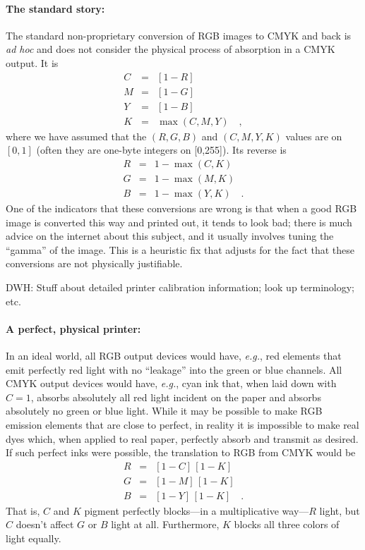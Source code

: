 \documentclass[letterpaper,preprint,dvipdf]{aastex}
\newcommand{\latin}[1]{\textit{#1}}
\newcommand{\eg}{\latin{e.g.}}
\begin{document}
\paragraph{The standard story:}
The standard non-proprietary conversion of RGB images to CMYK and back
is \latin{ad hoc} and does not consider the physical process of
absorption in a CMYK output.  It is
\begin{eqnarray}\displaystyle
C & = & [1-R] \nonumber \\
M & = & [1-G] \nonumber \\
Y & = & [1-B] \nonumber \\
K & = & \max(C,M,Y) \quad ,
\end{eqnarray}
where we have assumed that the $(R,G,B)$ and $(C,M,Y,K)$ values are on
$[0,1]$ (often they are one-byte integers on [0,255]).  Its reverse is
\begin{eqnarray}\displaystyle
R & = & 1-\max(C,K) \nonumber \\
G & = & 1-\max(M,K) \nonumber \\
B & = & 1-\max(Y,K) \quad .
\label{eq:standard}
\end{eqnarray}
One of the indicators that these conversions are wrong is that when a
good RGB image is converted this way and printed out, it tends to look
bad; there is much advice on the internet about this subject, and it
usually involves tuning the ``gamma'' of the image.  This is a
heuristic fix that adjusts for the fact that these conversions are not
physically justifiable.

DWH: Stuff about detailed printer calibration information; look up
terminology; etc.

\paragraph{A perfect, physical printer:}
In an ideal world, all RGB output devices would have, \eg, red
elements that emit perfectly red light with no ``leakage'' into the
green or blue channels.  All CMYK output devices would have, \eg, cyan
ink that, when laid down with $C=1$, absorbs absolutely all red light
incident on the paper and absorbs absolutely no green or blue light.
While it may be possible to make RGB emission elements that are close
to perfect, in reality it is impossible to make real dyes which, when
applied to real paper, perfectly absorb and transmit as desired.
If such perfect inks were possible, the translation to RGB from CMYK
would be
\begin{eqnarray}\displaystyle
R & = & [1-C]\,[1-K] \nonumber \\
G & = & [1-M]\,[1-K] \nonumber \\
B & = & [1-Y]\,[1-K] \quad .
\label{eq:ideal}
\end{eqnarray}
That is, $C$ and $K$ pigment perfectly blocks---in a multiplicative
way---$R$ light, but $C$ doesn't affect $G$ or $B$ light at all.
Furthermore, $K$ blocks all three colors of light equally.
\end{document}
